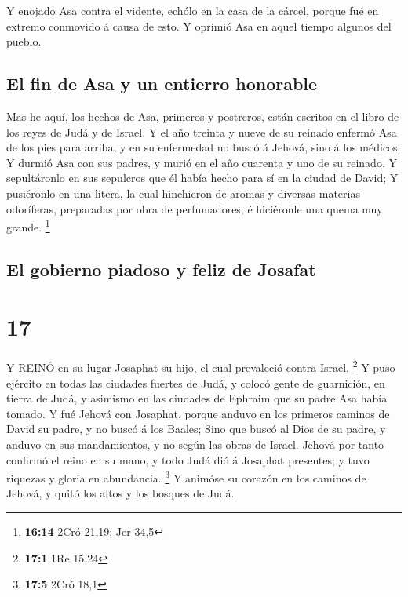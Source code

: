  Y enojado Asa contra el vidente, echólo en la casa de la
cárcel, porque fué en extremo conmovido á causa de esto. Y oprimió Asa
en aquel tiempo algunos del pueblo.

\hypertarget{el-fin-de-asa-y-un-entierro-honorable}{%
\subsection{El fin de Asa y un entierro
honorable}\label{el-fin-de-asa-y-un-entierro-honorable}}

 Mas he aquí, los hechos de Asa, primeros y postreros,
están escritos en el libro de los reyes de Judá y de Israel.
 Y el año treinta y nueve de su reinado enfermó Asa de los
pies para arriba, y en su enfermedad no buscó á Jehová, sino á los
médicos.  Y durmió Asa con sus padres, y murió en el año
cuarenta y uno de su reinado.  Y sepultáronlo en sus
sepulcros que él había hecho para sí en la ciudad de David; Y pusiéronlo
en una litera, la cual hinchieron de aromas y diversas materias
odoríferas, preparadas por obra de perfumadores; é hiciéronle una quema
muy grande. \footnote{\textbf{16:14} 2Cró 21,19; Jer 34,5}

\hypertarget{el-gobierno-piadoso-y-feliz-de-josafat}{%
\subsection{El gobierno piadoso y feliz de
Josafat}\label{el-gobierno-piadoso-y-feliz-de-josafat}}

\hypertarget{section-16}{%
\section{17}\label{section-16}}

 Y REINÓ en su lugar Josaphat su hijo, el cual prevaleció
contra Israel. \footnote{\textbf{17:1} 1Re 15,24}  Y puso
ejército en todas las ciudades fuertes de Judá, y colocó gente de
guarnición, en tierra de Judá, y asimismo en las ciudades de Ephraim que
su padre Asa había tomado.  Y fué Jehová con Josaphat,
porque anduvo en los primeros caminos de David su padre, y no buscó á
los Baales;  Sino que buscó al Dios de su padre, y anduvo en
sus mandamientos, y no según las obras de Israel.  Jehová
por tanto confirmó el reino en su mano, y todo Judá dió á Josaphat
presentes; y tuvo riquezas y gloria en abundancia. \footnote{\textbf{17:5}
  2Cró 18,1}  Y animóse su corazón en los caminos de Jehová,
y quitó los altos y los bosques de Judá.

